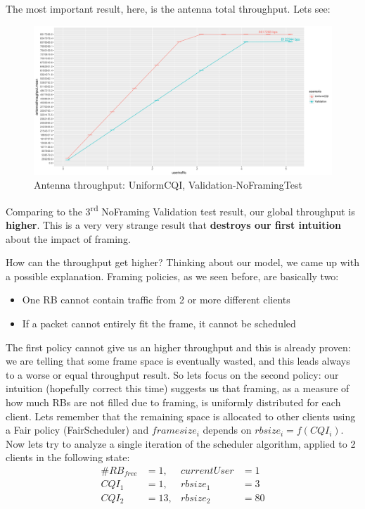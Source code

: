 The most important result, here, is the antenna total throughput. Lets see:
\begin{figure}[H]
  \includegraphics[width=1\textwidth]{images/thantenna1}
  \caption{Antenna throughput: UniformCQI, Validation-NoFramingTest}
  \label{fig:Antenna throughput: UniformCQI, Validation-NoFramingTest}
\end{figure}

Comparing to the 3\textsuperscript{rd} NoFraming Validation test result, our global throughput is \textbf{higher}. This is a very very strange result that \textbf{destroys our first intuition} about the impact of framing.

How can the throughput get higher? Thinking about our model, we came up with a possible explanation. Framing policies, as we seen before, are basically two:
\begin{itemize}
	\item One RB cannot contain traffic from 2 or more different clients
	\item If a packet cannot entirely fit the frame, it cannot be scheduled
\end{itemize}
The first policy cannot give us an higher throughput and this is already proven: we are telling that some frame space is eventually wasted, and this leads always to a worse or equal throughput result. So lets focus on the second policy: our intuition (hopefully correct this time) suggests us that framing, as a measure of how much RBs are not filled due to framing, is uniformly distributed for each client. Lets remember that the remaining space is allocated to other clients using a Fair policy (FairScheduler) and \(framesize_i\) depends on \(rbsize_i = f(CQI_i)\). Now lets try to analyze a single iteration of the scheduler algorithm, applied to 2 clients in the following state:
\begin{align}
 \#RB_{free} &= 1, &currentUser &= 1 \nonumber \\
 	   CQI_1 &= 1, &rbsize_1 &= 3 \nonumber \\
	   CQI_2 &= 13, &rbsize_2 &= 80 \nonumber
\end{align}

